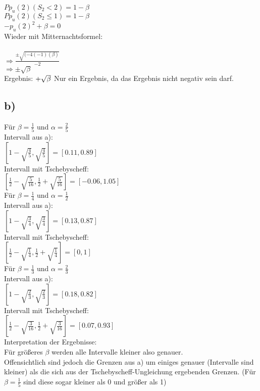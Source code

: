 \documentclass{article}
\begin{document}
				$P{p_u(2)}(S_2<2) = 1-\beta$\\[1em]
				$P{p_u(2)}(S_2\leq 1) = 1-\beta$\\[1em]
				$-p_u(2)^2 +\beta= 0$\\[1em]
				Wieder mit Mitternachtsformel:\\\\
				$\Rightarrow \frac{\pm\sqrt{(-4(-1)(\beta)}}{-2}$\\[1em]
				$\Rightarrow \pm \sqrt{\beta}$\\[1em]
				Ergebnis: $+ \sqrt{\beta}\\$ 
				Nur ein Ergebnis, da das Ergebnis nicht negativ sein darf.
				
			\subsection*{b)}
				Für $\beta=\frac{1}{5}$ und $\alpha=\frac{2}{5}$\\[1em]
				Intervall aus a):\\[1em]
				$[1-\sqrt{\frac{4}{5}},\sqrt{\frac{4}{5}}]=[0.11, 0.89]$\\[1em]
				Intervall mit Tschebyscheff:\\[1em]
				$[\frac{1}{2}-\sqrt{\frac{5}{16}},\frac{1}{2}+\sqrt{\frac{5}{16}}]=[-0.06, 1.05]$\\[1em]
				Für $\beta=\frac{1}{4}$ und $\alpha=\frac{1}{2}$\\[1em]
				Intervall aus a):\\[1em]
				$[1-\sqrt{\frac{3}{4}},\sqrt{\frac{3}{4}}]=[0.13,0.87]$\\[1em]
				Intervall mit Tschebyscheff:\\[1em]
				$[\frac{1}{2}-\sqrt{\frac{1}{4}},\frac{1}{2}+\sqrt{\frac{1}{4}}]=[0,1]$\\[4em]
				Für $\beta=\frac{1}{3}$ und $\alpha=\frac{2}{3}$\\[1em]
				Intervall aus a):\\[1em]
				$[1-\sqrt{\frac{2}{3}},\sqrt{\frac{2}{3}}]=[0.18,0.82]$\\[1em]
				Intervall mit Tschebyscheff:\\[1em]
				$[\frac{1}{2}-\sqrt{\frac{3}{16}},\frac{1}{2}+\sqrt{\frac{3}{16}}]=[0.07,0.93]$\\[2em]
				Interpretation der Ergebnisse:\\
				Für größeres $\beta$ werden alle Intervalle kleiner also genauer.\\
				Offensichtlich sind jedoch die Grenzen aus a) um einiges genauer (Intervalle sind kleiner) als die sich aus der Tschebyscheff-Ungleichung ergebenden Grenzen. (Für $\beta=\frac{1}{5}$ sind diese sogar kleiner als 0 und größer als 1)
				
				
				  
\end{document}
